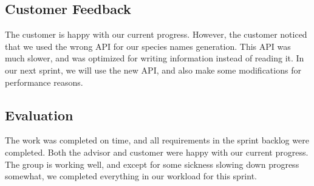\subsection{Customer Feedback}
The customer is happy with our current progress. However, the customer noticed that we used the wrong API for our species names generation. This API was much slower, and was optimized for writing information instead of reading it. In our next sprint, we will use the new API, and also make some modifications for performance reasons.

\subsection{Evaluation}
The work was completed on time, and all requirements in the sprint backlog were completed. Both the advisor and customer were happy with our current progress. The group is working well, and except for some sickness slowing down progress somewhat, we completed everything in our workload for this sprint.
